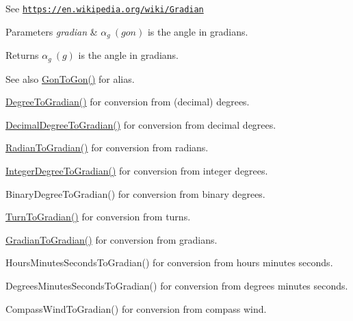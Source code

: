 See \href{https://en.wikipedia.org/wiki/Gradian}{\tt https\+://en.\+wikipedia.\+org/wiki/\+Gradian} 
\begin{DoxyParams}{Parameters}
{\em gradian} & $\alpha_{g}\ (gon)$ is the angle in gradians. \\
\hline
\end{DoxyParams}
\begin{DoxyReturn}{Returns}
$\alpha_{g}\ (g)$ is the angle in gradians. 
\end{DoxyReturn}
\begin{DoxySeeAlso}{See also}
\mbox{\hyperlink{group___e_g_x_math-_angle_conversions-_gon_ga9f2fb553662f3367fc65b5de24128a27}{Gon\+To\+Gon()}} for alias. 

\mbox{\hyperlink{group___e_g_x_math-_angle_conversions-_degree_ga25bb5506b3f66fff7a1b85bf7bd795b3}{Degree\+To\+Gradian()}} for conversion from (decimal) degrees. 

\mbox{\hyperlink{group___e_g_x_math-_angle_conversions-_decimal_degree_ga3ac6f1ceb36a4938cdf3b55554734c99}{Decimal\+Degree\+To\+Gradian()}} for conversion from decimal degrees. 

\mbox{\hyperlink{group___e_g_x_math-_angle_conversions-_radian_ga3c1607eae50cbf0186c42485bb3878d5}{Radian\+To\+Gradian()}} for conversion from radians. 

\mbox{\hyperlink{group___e_g_x_math-_angle_conversions-_integer_degree_ga47127467ff7a8ef57f6be9ce496a97df}{Integer\+Degree\+To\+Gradian()}} for conversion from integer degrees. 

Binary\+Degree\+To\+Gradian() for conversion from binary degrees. 

\mbox{\hyperlink{group___e_g_x_math-_angle_conversions-_turn_gad6aa9bdde2cde17cec136b24ee017bba}{Turn\+To\+Gradian()}} for conversion from turns. 

\mbox{\hyperlink{group___e_g_x_math-_angle_conversions-_gradian_ga0dcd5b58c4073a9df5e0a210aca307ce}{Gradian\+To\+Gradian()}} for conversion from gradians. 

Hours\+Minutes\+Seconds\+To\+Gradian() for conversion from hours minutes seconds. 

Degrees\+Minutes\+Seconds\+To\+Gradian() for conversion from degrees minutes seconds. 

Compass\+Wind\+To\+Gradian() for conversion from compass wind. 
\end{DoxySeeAlso}
\mbox{\label{group___e_g_x_math-_angle_conversions-_gon_gac7263c178052895c8b1a71190b62aabc}} 
